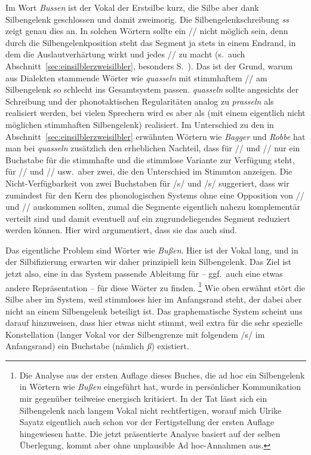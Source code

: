 Im Wort \textit{Bussen} \textipa{[bU\Sgel{s}@n]} ist der Vokal der Erstsilbe kurz, die Silbe aber dank Silbengelenk geschlossen und damit zweimorig.
Die Silbengelenkschreibung \textit{ss} zeigt genau dies an.
In solchen Wörtern sollte ein // nicht möglich sein, denn durch die Silbengelenkposition steht das Segment ja stets in einem Endrand, in dem die Auslautverhärtung wirkt und jedes // zu \textipa{[s]} macht (s.\ auch Abschnitt~\ref{sec:einsilblerzweisilbler}, besonders S.~\pageref{abs:silbengelenkstimmlos}).
Das ist der Grund, warum aus Dialekten stammende Wörter wie \textit{quasseln} mit stimmhaftem // am Silbengelenk so schlecht ins Gesamtsystem passen.
\textit{quasseln} sollte angesichts der Schreibung und der phonotaktischen Regularitäten analog zu \textit{prasseln}  als  realisiert werden, bei vielen Sprechern wird es aber als  (mit einem eigentlich nicht möglichen stimmhaften Silbengelenk) realisiert.
Im Unterschied zu den in Abschnitt~\ref{sec:einsilblerzweisilbler} erwähnten Wörtern wie \textit{Bagger} und \textit{Robbe} hat man bei \textit{quasseln} zusätzlich den erheblichen Nachteil, dass für // und // nur ein Buchstabe für die stimmhafte und die stimmlose Variante zur Verfügung steht, für // und // usw.\ aber zwei, die den Unterschied im Stimmton anzeigen.
Die Nicht-Verfügbarkeit von zwei Buchstaben für /s/ und /s/ suggeriert, dass wir zumindest für den Kern des phonologischen Systems ohne eine Opposition von // und // auskommen sollten, zumal die Segmente eigentlich nahezu komplementär verteilt sind und damit eventuell auf ein zugrundeliegendes Segment reduziert werden können.
Hier wird argumentiert, dass sie das auch sind.

Das eigentliche Problem sind Wörter wie \textit{Bußen}.
Hier ist der Vokal lang, und in der Silbifizierung \textipa{[bu:.s@n]} erwarten wir daher prinzipiell kein Silbengelenk.
Das Ziel ist jetzt also, eine in das System passende Ableitung für \textipa{[bu:.s@n]} -- ggf.\ auch eine etwas andere Repräsentation -- für diese Wörter zu finden.%
\footnote{Die Analyse aus der ersten Auflage dieses Buches, die ad hoc ein Silbengelenk in Wörtern wie \textit{Bußen} eingeführt hat, wurde in persönlicher Kommunikation mir gegenüber teilweise energisch kritisiert.
In der Tat lässt sich ein Silbengelenk nach langem Vokal nicht rechtfertigen, worauf mich Ulrike Sayatz eigentlich auch schon vor der Fertigstellung der ersten Auflage hingewiesen hatte.
Die jetzt präsentierte Analyse basiert auf der selben Überlegung, kommt aber ohne unplausible Ad hoc-Annahmen aus.}
Wie oben erwähnt stört die Silbe \textipa{[s@n]} aber im System, weil stimmloses \textipa{[s]} hier im Anfangsrand steht, der dabei aber nicht an einem Silbengelenk beteiligt ist.
Das graphematische System scheint uns darauf hinzuweisen, dass hier etwas nicht stimmt, weil extra für die sehr spezielle Konstellation (langer Vokal vor der Silbengrenze mit folgendem /s/ im Anfangsrand) ein Buchstabe (nämlich \textit{ß}) existiert.

